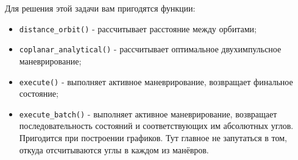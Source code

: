\documentclass[12pt]{article}
\begin{document}
\begin{enumerate}
  
  Для решения этой задачи вам пригодятся функции:
  \begin{itemize}
      \item \texttt{distance\_orbit()} - рассчитывает расстояние между орбитами;
      \item \texttt{coplanar\_analytical()} - рассчитывает оптимальное двухимпульсное маневрирование;
      \item \texttt{execute()} - выполняет активное маневрирование, возвращает финальное состояние;
      \item \texttt{execute\_batch()} - выполняет активное маневрирование, возвращает последовательность состояний и соответствующих им абсолютных углов. Пригодится при построении графиков. Тут главное не запутаться в том, откуда отсчитываются углы в каждом из манёвров.
  \end{itemize}
  
\end{enumerate}
\end{document}
